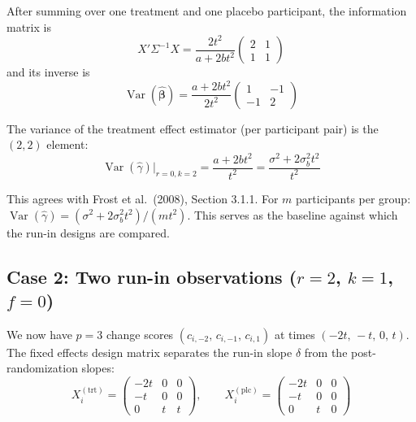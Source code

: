 \documentclass[
]{article}
\begin{document}
After summing over one treatment and one placebo participant, the
information matrix is \begin{equation}
  X'\Sigma^{-1}X
  = \frac{2t^2}{a + 2bt^2}
    \begin{pmatrix} 2 & 1 \\ 1 & 1 \end{pmatrix}
\end{equation} and its inverse is \begin{equation}
  \mathop{\mathrm{Var}}(\hat{\boldsymbol{\beta}})
  = \frac{a + 2bt^2}{2t^2}
    \begin{pmatrix} 1 & -1 \\ -1 & 2 \end{pmatrix}
  \label{eq:var_frost}
\end{equation}

The variance of the treatment effect estimator (per participant pair) is
the \((2,2)\) element: \begin{equation}
  \boxed{
    \mathop{\mathrm{Var}}(\hat{\gamma})\big|_{r=0,k=2}
    = \frac{a + 2bt^2}{t^2}
    = \frac{\sigma^2 + 2\sigma_b^2 t^2}{t^2}
  }
  \label{eq:var_r0k2}
\end{equation}

This agrees with Frost et al.~(2008), Section 3.1.1. For \(m\)
participants per group:
\(\mathop{\mathrm{Var}}(\hat{\gamma}) = (\sigma^2 + 2\sigma_b^2 t^2) /
(m t^2)\). This serves as the baseline against which the run-in designs
are compared.

\subsection{\texorpdfstring{Case 2: Two run-in observations (\(r=2\),
\(k=1\),
\(f=0\))}{Case 2: Two run-in observations (r=2, k=1, f=0)}}\label{case-2-two-run-in-observations-r2-k1-f0}

We now have \(p = 3\) change scores \((c_{i,-2},\, c_{i,-1},\,
c_{i,1})\) at times \((-2t,\, -t,\, 0,\, t)\). The fixed effects design
matrix separates the run-in slope \(\delta\) from the post-randomization
slopes: \[
  X_i^{(\text{trt})} = \begin{pmatrix}
    -2t & 0 & 0 \\ -t & 0 & 0 \\ 0 & t & t
  \end{pmatrix}, \qquad
  X_i^{(\text{plc})} = \begin{pmatrix}
    -2t & 0 & 0 \\ -t & 0 & 0 \\ 0 & t & 0
  \end{pmatrix}
\]
\end{document}

